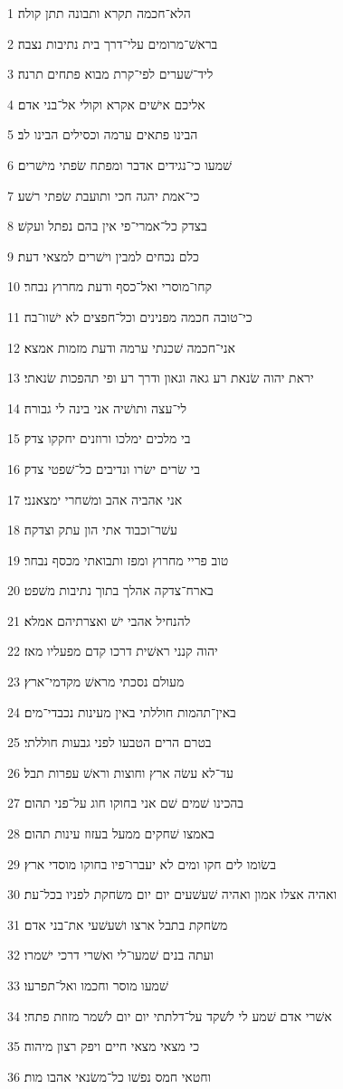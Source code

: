 \par 1 הלא־חכמה תקרא ותבונה תתן קולה׃
\par 2 בראשׁ־מרומים עלי־דרך בית נתיבות נצבה׃
\par 3 ליד־שׁערים לפי־קרת מבוא פתחים תרנה׃
\par 4 אליכם אישׁים אקרא וקולי אל־בני אדם׃
\par 5 הבינו פתאים ערמה וכסילים הבינו לב׃
\par 6 שׁמעו כי־נגידים אדבר ומפתח שׂפתי מישׁרים׃
\par 7 כי־אמת יהגה חכי ותועבת שׂפתי רשׁע׃
\par 8 בצדק כל־אמרי־פי אין בהם נפתל ועקשׁ׃
\par 9 כלם נכחים למבין וישׁרים למצאי דעת׃
\par 10 קחו־מוסרי ואל־כסף ודעת מחרוץ נבחר׃
\par 11 כי־טובה חכמה מפנינים וכל־חפצים לא ישׁוו־בה׃
\par 12 אני־חכמה שׁכנתי ערמה ודעת מזמות אמצא׃
\par 13 יראת יהוה שׂנאת רע גאה וגאון ודרך רע ופי תהפכות שׂנאתי׃
\par 14 לי־עצה ותושׁיה אני בינה לי גבורה׃
\par 15 בי מלכים ימלכו ורוזנים יחקקו צדק׃
\par 16 בי שׂרים ישׂרו ונדיבים כל־שׁפטי צדק׃
\par 17 אני אהביה אהב ומשׁחרי ימצאנני׃
\par 18 עשׁר־וכבוד אתי הון עתק וצדקה׃
\par 19 טוב פריי מחרוץ ומפז ותבואתי מכסף נבחר׃
\par 20 בארח־צדקה אהלך בתוך נתיבות משׁפט׃
\par 21 להנחיל אהבי ישׁ ואצרתיהם אמלא׃
\par 22 יהוה קנני ראשׁית דרכו קדם מפעליו מאז׃
\par 23 מעולם נסכתי מראשׁ מקדמי־ארץ׃
\par 24 באין־תהמות חוללתי באין מעינות נכבדי־מים׃
\par 25 בטרם הרים הטבעו לפני גבעות חוללתי׃
\par 26 עד־לא עשׂה ארץ וחוצות וראשׁ עפרות תבל׃
\par 27 בהכינו שׁמים שׁם אני בחוקו חוג על־פני תהום׃
\par 28 באמצו שׁחקים ממעל בעזוז עינות תהום׃
\par 29 בשׂומו לים חקו ומים לא יעברו־פיו בחוקו מוסדי ארץ׃
\par 30 ואהיה אצלו אמון ואהיה שׁעשׁעים יום יום משׂחקת לפניו בכל־עת׃
\par 31 משׂחקת בתבל ארצו ושׁעשׁעי את־בני אדם׃
\par 32 ועתה בנים שׁמעו־לי ואשׁרי דרכי ישׁמרו׃
\par 33 שׁמעו מוסר וחכמו ואל־תפרעו׃
\par 34 אשׁרי אדם שׁמע לי לשׁקד על־דלתתי יום יום לשׁמר מזוזת פתחי׃
\par 35 כי מצאי מצאי חיים ויפק רצון מיהוה׃
\par 36 וחטאי חמס נפשׁו כל־משׂנאי אהבו מות׃

